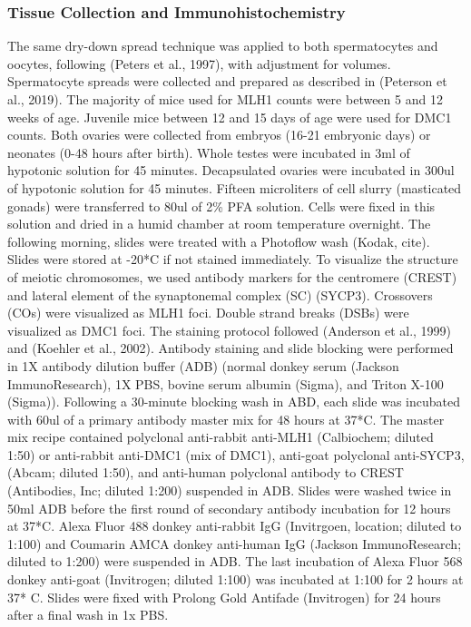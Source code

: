 \documentclass[
]{article}
\begin{document}
\hypertarget{tissue-collection-and-immunohistochemistry}{%
\subsubsection{Tissue Collection and
Immunohistochemistry}\label{tissue-collection-and-immunohistochemistry}}

The same dry-down spread technique was applied to both spermatocytes and
oocytes, following (Peters et al., 1997), with adjustment for volumes.
Spermatocyte spreads were collected and prepared as described in
(Peterson et al., 2019). The majority of mice used for MLH1 counts were
between 5 and 12 weeks of age. Juvenile mice between 12 and 15 days of
age were used for DMC1 counts. Both ovaries were collected from embryos
(16-21 embryonic days) or neonates (0-48 hours after birth). Whole
testes were incubated in 3ml of hypotonic solution for 45 minutes.
Decapsulated ovaries were incubated in 300ul of hypotonic solution for
45 minutes. Fifteen microliters of cell slurry (masticated gonads) were
transferred to 80ul of 2\% PFA solution. Cells were fixed in this
solution and dried in a humid chamber at room temperature overnight. The
following morning, slides were treated with a Photoflow wash (Kodak,
cite). Slides were stored at -20*C if not stained immediately. To
visualize the structure of meiotic chromosomes, we used antibody markers
for the centromere (CREST) and lateral element of the synaptonemal
complex (SC) (SYCP3). Crossovers (COs) were visualized as MLH1 foci.
Double strand breaks (DSBs) were visualized as DMC1 foci. The staining
protocol followed (Anderson et al., 1999) and (Koehler et al., 2002).
Antibody staining and slide blocking were performed in 1X antibody
dilution buffer (ADB) (normal donkey serum (Jackson ImmunoResearch), 1X
PBS, bovine serum albumin (Sigma), and Triton X-100 (Sigma)). Following
a 30-minute blocking wash in ABD, each slide was incubated with 60ul of
a primary antibody master mix for 48 hours at 37*C. The master mix
recipe contained polyclonal anti-rabbit anti-MLH1 (Calbiochem; diluted
1:50) or anti-rabbit anti-DMC1 (mix of DMC1), anti-goat polyclonal
anti-SYCP3, (Abcam; diluted 1:50), and anti-human polyclonal antibody to
CREST (Antibodies, Inc; diluted 1:200) suspended in ADB. Slides were
washed twice in 50ml ADB before the first round of secondary antibody
incubation for 12 hours at 37*C. Alexa Fluor 488 donkey anti-rabbit IgG
(Invitrgoen, location; diluted to 1:100) and Coumarin AMCA donkey
anti-human IgG (Jackson ImmunoResearch; diluted to 1:200) were suspended
in ADB. The last incubation of Alexa Fluor 568 donkey anti-goat
(Invitrogen; diluted 1:100) was incubated at 1:100 for 2 hours at 37* C.
Slides were fixed with Prolong Gold Antifade (Invitrogen) for 24 hours
after a final wash in 1x PBS.
\end{document}
